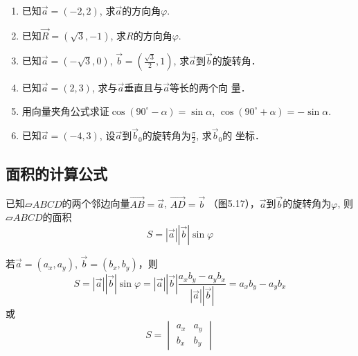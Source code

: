 \begin{ex}
\begin{enumerate}
    \item 已知$\vec{a}=(-2,2)$, 求$\vec{a}$的方向角$\varphi$.
    \item 已知$\vec{R}=(\sqrt{3},-1)$, 求$R$的方向角$\varphi$.
    
    \item 已知$\vec{a}=(-\sqrt{3},0)$, $\vec{b}=\left(\frac{\sqrt{3}}{2},1\right)$, 
    求$\vec{a}$到$\vec{b}$的旋转角．
    \item 已知$\vec{a}=(2,3)$, 求与$\vec{a}$垂直且与$\vec{a}$等长的两个向
    量．
    \item 用向量夹角公式求证$\cos(90^{\circ}-\alpha)=\sin\alpha$, $\cos(90^{\circ}+\alpha)=-\sin\alpha$.
    \item 已知$\vec{a}=(-4,3)$, 设$\vec{a}$到$\vec{b}_0$的旋转角为$\frac{\pi}{2}$,  求$\vec{b}_0$的
    坐标．
\end{enumerate}
\end{ex}

\subsection{面积的计算公式}
已知$\parallelogram{ABCD}$的两个邻边向量$\Vec{AB}=\vec{a}$, $\Vec{AD}=\vec{b}$
（图5.17），$\vec{a}$到$\vec{b}$的旋转角为$\varphi$, 则$\parallelogram{ABCD}$的面积
\[S=|\vec{a}|\left|\vec{b}\right|\sin\varphi\]

\begin{figure}[htp]
    \centering
{}
    \caption{}
\end{figure}


若$\vec{a}=(a_x,a_y)$, $\vec{b}=(b_x,b_y)$，则
\[S=|\vec{a}|\left|\vec{b}\right|\sin\varphi=|\vec{a}|\left|\vec{b}\right|\frac{a_xb_y-a_yb_x}{|\vec{a}|\left|\vec{b}\right|}=a_xb_y-a_yb_x\]
或
\begin{equation}
    S=\begin{vmatrix}
        a_x&a_y\\b_x&b_y
    \end{vmatrix}
\end{equation}

